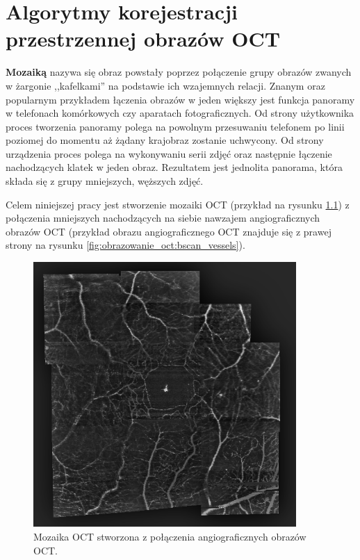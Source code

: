 %
\chapter{Algorytmy korejestracji przestrzennej obrazów OCT}
\label{sec:algorytmy_korejestracji}

\textbf{Mozaiką} nazywa się obraz powstały poprzez połączenie grupy obrazów zwanych w żargonie ,,kafelkami'' na podstawie ich wzajemnych relacji. Znanym oraz popularnym przykładem łączenia obrazów w jeden większy jest funkcja panoramy w telefonach komórkowych czy aparatach fotograficznych. Od strony użytkownika proces tworzenia panoramy polega na powolnym przesuwaniu telefonem po linii poziomej do momentu aż żądany krajobraz zostanie uchwycony. Od strony urządzenia proces polega na wykonywaniu serii zdjęć oraz następnie łączenie nachodzących klatek w jeden obraz. Rezultatem jest jednolita panorama, która składa się z grupy mniejszych, węższych zdjęć.

Celem niniejszej pracy jest stworzenie mozaiki OCT (przykład na rysunku \ref{fig:algorytmy_korejestracji:mosaic}) z połączenia mniejszych nachodzących na siebie nawzajem angiograficznych obrazów OCT (przykład obrazu angiograficznego OCT znajduje się z prawej strony na rysunku \ref{fig:obrazowanie_oct:bscan_vessels}).

\begin{figure}[htb]
  \centering
  \includegraphics[width=10cm]{gfx/mosaic}
  \caption{Mozaika OCT stworzona z połączenia angiograficznych obrazów OCT.}
  \label{fig:algorytmy_korejestracji:mosaic}
\end{figure}

